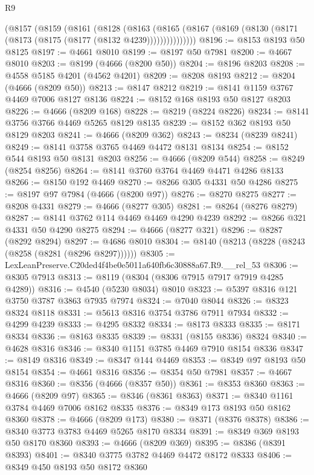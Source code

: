 \begin{lexlean}{R9}
\begin{coremodule}
      (@8157
        (@8159
          (@8161
            (@8128
              (@8163
                (@8165 (@8167 (@8169 (@8130 (@8171 (@8173 (@8175 (@8177 (@8132 @4239)))))))))))))))
@8196 := @8153 @8193 @50 @8125
@8197 := @4661 @8010
@8199 := @8197 @50 @7981
@8200 := @4667 @8010
@8203 := @8199 (@4666 (@8200 @50))
@8204 := @8196 @8203
@8208 := @4558 @5185 @4201 (@4562 @4201)
@8209 := @8208 @8193
@8212 := @8204 (@4666 (@8209 @50))
@8213 := @8147 @8212
@8219 := @8141 @1159 @3767 @4469 @7006 @8127 @8136
@8224 := @8152 @168 @8193 @50 @8127 @8203
@8226 := @4666 (@8209 @168)
@8228 := @8219 (@8224 @8226)
@8234 := @8141 @3756 @3766 @4469 @5265 @8129 @8135
@8239 := @8152 @362 @8193 @50 @8129 @8203
@8241 := @4666 (@8209 @362)
@8243 := @8234 (@8239 @8241)
@8249 := @8141 @3758 @3765 @4469 @4472 @8131 @8134
@8254 := @8152 @544 @8193 @50 @8131 @8203
@8256 := @4666 (@8209 @544)
@8258 := @8249 (@8254 @8256)
@8264 := @8141 @3760 @3764 @4469 @4471 @4286 @8133
@8266 := @8150 @192 @4469
@8270 := @8266 @305 @4331 @50 @4286
@8275 := @8197 @97 @7984 (@4666 (@8200 @97))
@8276 := @8270 @8275
@8277 := @8208 @4331
@8279 := @4666 (@8277 @305)
@8281 := @8264 (@8276 @8279)
@8287 := @8141 @3762 @114 @4469 @4469 @4290 @4239
@8292 := @8266 @321 @4331 @50 @4290 @8275
@8294 := @4666 (@8277 @321)
@8296 := @8287 (@8292 @8294)
@8297 := @4686 @8010
@8304 := @8140 (@8213 (@8228 (@8243 (@8258 (@8281 (@8296 @8297))))))
@8305 := LexLeanPreserve.C20ded4f4be0e5011a640fb6c30888a67.R9.__rel_53
@8306 := @8305 @7913
@8313 := @8119 (@8304 (@8306 @7915 @7917 @7919 @4285 @4289))
@8316 := @4540 (@5230 @8034) @8010
@8323 := @5397 @8316 @121 @3750 @3787 @3863 @7935 @7974
@8324 := @7040 @8044
@8326 := @8323 @8324 @8118
@8331 := @5613 @8316 @3754 @3786 @7911 @7934
@8332 := @4299 @4239
@8333 := @4295 @8332
@8334 := @8173 @8333
@8335 := @8171 @8334
@8336 := @8163 @8335
@8339 := @8331 (@8155 @8336) @8324
@8340 := @4628 @8316
@8346 := @8340 @1151 @3785 @4469 @7910 @8154 @8336
@8347 := @8149 @8316
@8349 := @8347 @144 @4469
@8353 := @8349 @97 @8193 @50 @8154
@8354 := @4661 @8316
@8356 := @8354 @50 @7981
@8357 := @4667 @8316
@8360 := @8356 (@4666 (@8357 @50))
@8361 := @8353 @8360
@8363 := @4666 (@8209 @97)
@8365 := @8346 (@8361 @8363)
@8371 := @8340 @1161 @3784 @4469 @7006 @8162 @8335
@8376 := @8349 @173 @8193 @50 @8162 @8360
@8378 := @4666 (@8209 @173)
@8380 := @8371 (@8376 @8378)
@8386 := @8340 @3773 @3783 @4469 @5265 @8170 @8334
@8391 := @8349 @369 @8193 @50 @8170 @8360
@8393 := @4666 (@8209 @369)
@8395 := @8386 (@8391 @8393)
@8401 := @8340 @3775 @3782 @4469 @4472 @8172 @8333
@8406 := @8349 @450 @8193 @50 @8172 @8360

\end{coremodule}
\end{lexlean}
